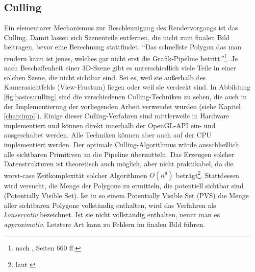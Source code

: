 \subsection{Culling}
\label{sec:basics:algos:culling}
Ein elementarer Mechanismus zur Beschleunigung des Rendervorgangs ist das Culling. Damit lassen sich Szenenteile entfernen, die nicht zum finalen Bild beitragen, bevor eine Berechnung stattfindet. "`Das schnellste Polygon das man rendern kann ist jenes, welches gar nicht erst die Grafik-Pipeline betritt."'\footnote{nach \cite{RTR3}, Seiten 660 ff.}. Je nach Beschaffenheit einer 3D-Szene gibt es unterschiedlich viele Teile in einer solchen Szene, die nicht sichtbar sind. Sei es, weil sie außerhalb des Kamerasichtfelds (View-Frustum) liegen oder weil sie verdeckt sind. In Abbildung \ref{fig:basics:culling} sind die verschiedenen Culling-Techniken zu sehen, die auch in der Implementierung der vorliegenden Arbeit verwendet wurden (siehe Kapitel \ref{chap:impl}).
Einige dieser Culling-Verfahren sind mittlerweile in Hardware implementiert und können direkt innerhalb der OpenGL-API ein- und ausgeschaltet werden. Alle Techniken können aber auch auf der CPU implementiert werden. Der optimale Culling-Algorithmus würde ausschließlich alle sichtbaren Primitiven an die Pipeline übermitteln. Das Erzeugen solcher Datenstrukturen ist theoretisch auch möglich, aber nicht praktikabel, da die worst-case Zeitkomplexität solcher Algorithmen $O(n^{9})$ beträgt\footnote{laut \cite{culling}}. Stattdessen wird versucht, die Menge der Polygone zu ermitteln, die potentiell sichtbar sind (Potentially Visible Set). Ist in so einem Potentially Visible Set (PVS) die Menge aller sichtbaren Polygone vollständig enthalten, wird das Verfahren als \textit{konservativ} bezeichnet. Ist sie nicht vollständig enthalten, nennt man es \textit{approximativ}. Letztere Art kann zu Fehlern im finalen Bild führen.

